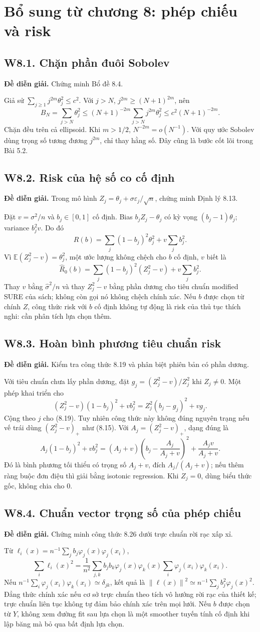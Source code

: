 \documentclass[11pt,a4paper]{article}
\newcommand{\E}{\mathbb E}\newcommand{\Pp}{\mathbb P}
\newcommand{\norm}[1]{\left\lVert#1\right\rVert}
\newcommand{\supp}[3]{\subsection{#1. #2}\label{s:#1}\textbf{Đề diễn giải.} #3\par}
\begin{document}
\section{Bổ sung từ chương 8: phép chiếu và risk}
\supp{W8.1}{Chặn phần đuôi Sobolev}{Chứng minh Bổ đề 8.4.}
Giả sử $\sum_{j\ge1}j^{2m}\theta_j^2\le c^2$. Với $j>N$, $j^{2m}\ge(N+1)^{2m}$, nên
\[
B_N=\sum_{j>N}\theta_j^2\le(N+1)^{-2m}\sum_{j>N}j^{2m}\theta_j^2
\le c^2(N+1)^{-2m}.
\]
Chặn đều trên cả ellipsoid. Khi $m>1/2$, $N^{-2m}=o(N^{-1})$. Với quy ước Sobolev dùng trọng số tương đương $j^{2m}$, chỉ thay hằng số. Đây cũng là bước cốt lõi trong Bài 5.2.

\supp{W8.2}{Risk của hệ số co cố định}{Trong mô hình $Z_j=\theta_j+\sigma\varepsilon_j/\sqrt n$, chứng minh Định lý 8.13.}
Đặt $v=\sigma^2/n$ và $b_j\in[0,1]$ cố định. Bias $b_jZ_j-\theta_j$ có kỳ vọng $(b_j-1)\theta_j$; variance $b_j^2v$. Do đó
\[
R(b)=\sum_j(1-b_j)^2\theta_j^2+v\sum_jb_j^2.
\]
Vì $\E(Z_j^2-v)=\theta_j^2$, một ước lượng không chệch cho $b$ cố định, $v$ biết là
\[
\widehat R_0(b)=\sum_j(1-b_j)^2(Z_j^2-v)+v\sum_jb_j^2.
\]
Thay $v$ bằng $\widehat\sigma^2/n$ và thay $Z_j^2-v$ bằng phần dương cho tiêu chuẩn modified SURE của sách; không còn gọi nó không chệch chính xác. Nếu $b$ được chọn từ chính $Z$, công thức risk với $b$ cố định không tự động là risk của thủ tục thích nghi: cần phân tích lựa chọn thêm.

\supp{W8.3}{Hoàn bình phương tiêu chuẩn risk}{Kiểm tra công thức 8.19 và phân biệt phiên bản có phần dương.}
Với tiêu chuẩn chưa lấy phần dương, đặt $g_j=(Z_j^2-v)/Z_j^2$ khi $Z_j\ne0$.
Một phép khai triển cho
\[
(Z_j^2-v)(1-b_j)^2+vb_j^2=Z_j^2(b_j-g_j)^2+vg_j.
\]
Cộng theo $j$ cho (8.19). Tuy nhiên công thức này không đúng nguyên trạng nếu vế trái dùng $(Z_j^2-v)_+$ như (8.15). Với $A_j=(Z_j^2-v)_+$, dạng đúng là
\[
A_j(1-b_j)^2+vb_j^2
=(A_j+v)\left(b_j-\frac{A_j}{A_j+v}\right)^2+\frac{A_jv}{A_j+v}.
\]
Đó là bình phương tối thiểu có trọng số $A_j+v$, đích $A_j/(A_j+v)$; nếu thêm ràng buộc đơn điệu thì giải bằng isotonic regression. Khi $Z_j=0$, dùng biểu thức gốc, không chia cho 0.

\supp{W8.4}{Chuẩn vector trọng số của phép chiếu}{Chứng minh công thức 8.26 dưới trực chuẩn rời rạc xấp xỉ.}
Từ $\ell_i(x)=n^{-1}\sum_jb_j\varphi_j(x)\varphi_j(x_i)$,
\[
\sum_i\ell_i(x)^2=\frac1{n^2}\sum_{j,k}b_jb_k\varphi_j(x)\varphi_k(x)
\sum_i\varphi_j(x_i)\varphi_k(x_i).
\]
Nếu $n^{-1}\sum_i\varphi_j(x_i)\varphi_k(x_i)\simeq\delta_{jk}$, kết quả là
$\norm{\ell(x)}^2\simeq n^{-1}\sum_jb_j^2\varphi_j(x)^2$. Đẳng thức chính xác nếu cơ sở trực chuẩn theo tích vô hướng rời rạc của thiết kế; trực chuẩn liên tục không tự đảm bảo chính xác trên mọi lưới. Nếu $b$ được chọn từ $Y$, không xem đường fit sau lựa chọn là một smoother tuyến tính cố định khi lập băng mà bỏ qua bất định lựa chọn.
\end{document}
